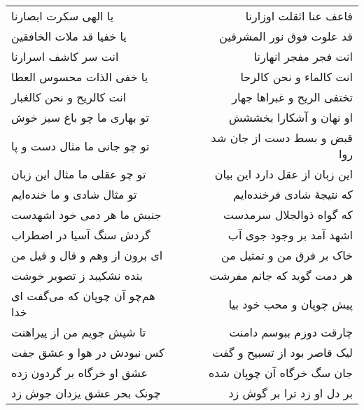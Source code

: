 \begin{center}
\begin{longtable}{l p{0.5cm} r}
\\
یا الهی سکرت ابصارنا
&&
فاعف عنا اثقلت اوزارنا
\\
یا خفیا قد ملات الخافقین
&&
قد علوت فوق نور المشرقین
\\
انت سر کاشف اسرارنا
&&
انت فجر مفجر انهارنا
\\
یا خفی الذات محسوس العطا
&&
انت کالماء و نحن کالرحا
\\
انت کالریح و نحن کالغبار
&&
تختفی الریح و غبراها جهار
\\
تو بهاری ما چو باغ سبز خوش
&&
او نهان و آشکارا بخششش
\\
تو چو جانی ما مثال دست و پا
&&
قبض و بسط دست از جان شد روا
\\
تو چو عقلی ما مثال این زبان
&&
این زبان از عقل دارد این بیان
\\
تو مثال شادی و ما خنده‌ایم
&&
که نتیجهٔ شادی فرخنده‌ایم
\\
جنبش ما هر دمی خود اشهدست
&&
که گواه ذوالجلال سرمدست
\\
گردش سنگ آسیا در اضطراب
&&
اشهد آمد بر وجود جوی آب
\\
ای برون از وهم و قال و قیل من
&&
خاک بر فرق من و تمثیل من
\\
بنده نشکیبد ز تصویر خوشت
&&
هر دمت گوید که جانم مفرشت
\\
هم‌چو آن چوپان که می‌گفت ای خدا
&&
پیش چوپان و محب خود بیا
\\
تا شپش جویم من از پیراهنت
&&
چارقت دوزم ببوسم دامنت
\\
کس نبودش در هوا و عشق جفت
&&
لیک قاصر بود از تسبیح و گفت
\\
عشق او خرگاه بر گردون زده
&&
جان سگ خرگاه آن چوپان شده
\\
چونک بحر عشق یزدان جوش زد
&&
بر دل او زد ترا بر گوش زد
\\
\end{longtable}
\end{center}
